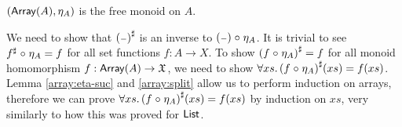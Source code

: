\begin{propositionrep}\label{array:univ}
    $(\operatorname{\mathsf{Array}}(A),\eta_A)$ is the free monoid on $A$.
\end{propositionrep}

\begin{proofsketch}
    We need to show that ${({\scriptstyle{-}})}^{\sharp}$ is an inverse to $({\scriptstyle{-}}) \mathrel{\circ} \eta_A$.
    It is trivial to see ${f}^{\sharp} \mathrel{\circ} \eta_A = f$ for all set functions $f : A \to X$.
    To show ${(f \mathrel{\circ} \eta_A)}^{\sharp} = f$ for all monoid homomorphism $f : \operatorname{\mathsf{Array}}(A) \to \mathfrak{X}$,
    we need to show $\forall xs.\, {(f \mathrel{\circ} \eta_A)}^{\sharp}(xs) = f(xs)$.
    Lemma \ref{array:eta-suc} and \ref{array:split} allow us to perform induction on arrays,
    therefore we can prove $\forall xs.\, {(f \mathrel{\circ} \eta_A)}^{\sharp}(xs) = f(xs)$ by induction on $xs$,
    very similarly to how this was proved for $\operatorname{\mathsf{List}}$.
\end{proofsketch}

